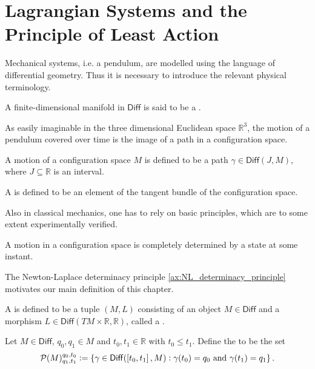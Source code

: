 \section*{Lagrangian Systems and the Principle of Least Action}
Mechanical systems, i.e. a pendulum, are modelled using the language of differential geometry. Thus it is necessary to introduce the relevant physical terminology. 

\begin{definition}
	A finite-dimensional manifold in $\mathsf{Diff}$ is said to be a .
\end{definition}

As easily imaginable in the three dimensional Euclidean space $\mathbb{R}^3$, the motion of a pendulum covered over time is the image of a path in a configuration space.

\begin{definition}[Motion]
	A motion of a configuration space $M$ is defined to be a path $\gamma \in \mathsf{Diff}(J, M)$, where $J \subseteq \mathbb{R}$ is an interval.
\end{definition}

\begin{definition}[State]
	A  is defined to be an element of the tangent bundle of the configuration space.
\end{definition}

Also in classical mechanics, one has to rely on basic principles, which are to some extent experimentally verified.

\begin{axiom}
	\label{ax:NL_determinacy_principle}
	A motion in a configuration space is completely determined by a state at some instant.
\end{axiom}

The Newton-Laplace determinacy principle \ref{ax:NL_determinacy_principle} motivates our main definition of this chapter.

\begin{definition}
	A  is defined to be a tuple $(M,L)$ consisting of an object $M \in \mathsf{Diff}$ and a morphism $L \in \mathsf{Diff}(TM \times \mathbb{R},\mathbb{R})$, called a .
\end{definition}

\begin{definition}
	\label{def:path_space}
	Let $M \in \mathsf{Diff}$, $q_0,q_1 \in M$ and $t_0, t_1 \in \mathbb{R}$ with $t_0 \leq t_1$. Define the  to be the set
	\begin{equation}
		\label{eq:path_space}
		\mathcal{P}(M)^{q_0,t_0}_{q_1,t_1} := \cbr[0]{\gamma \in \mathsf{Diff}(\intcc[0]{t_0,t_1},M) : \gamma(t_0) = q_0 \text{ and } \gamma(t_1) = q_1}.
			\end{equation}
\end{definition}

